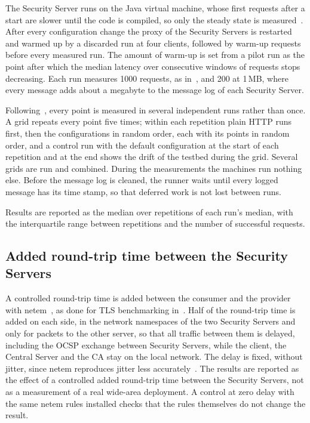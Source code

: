 \documentclass[conference,a4paper]{IEEEtran}
\begin{document}
The Security Server runs on the Java virtual machine, whose first requests after a start are slower
until the code is compiled, so only the steady state is measured~\cite{georges2007}. After every
configuration change the proxy of the Security Servers is restarted and warmed up by a discarded run at four
clients, followed by warm-up requests before every measured run. The amount of warm-up is set from a
pilot run as the point after which the median latency over consecutive windows of requests stops
decreasing. Each run measures 1000 requests, as in~\cite{bakhtina2026ijis}, and 200 at 1\,MB, where
every message adds about a megabyte to the message log of each Security Server.

Following~\cite{georges2007}, every point is measured in several independent runs rather than once.
A grid repeats every point five times; within each repetition plain HTTP runs first, then the
configurations in random order, each with its points in random order, and a control run with the default
configuration at the start of each repetition and at the end shows the drift of the testbed during
the grid. Several grids are run and combined. During the measurements the machines run nothing else. Before the message log is cleaned, the
runner waits until every logged message has its time stamp, so that deferred work is not lost
between runs.

Results are reported as the median over repetitions of each run's median, with the interquartile
range between repetitions and the number of successful requests.

\subsection{Added round-trip time between the Security Servers}\label{sec:delay}

A controlled round-trip time is added between the consumer and the provider with
netem~\cite{hemminger2005}, as done for TLS benchmarking in~\cite{paquin2020}. Half of the
round-trip time is added on each side, in the network namespaces of the two Security Servers and only
for packets to the other server, so that all traffic between them is delayed, including the OCSP
exchange between Security Servers, while the client, the Central Server and the CA stay on the local
network. The delay is fixed, without jitter, since netem reproduces jitter less
accurately~\cite{jurgelionis2011,nussbaum2009}. The results are reported as the effect of a
controlled added round-trip time between the Security Servers, not as a measurement of a real
wide-area deployment. A control at zero delay with the same netem rules installed checks that the
rules themselves do not change the result.
\end{document}
